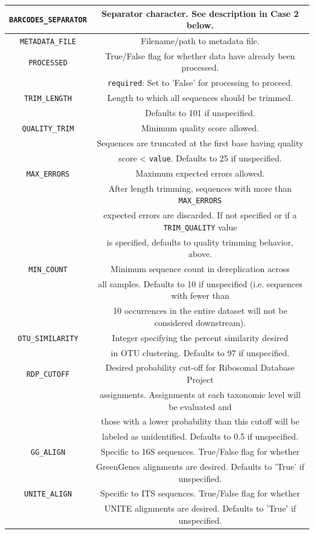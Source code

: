 \documentclass[11pt, oneside]{article}   	%
\begin{document}
\begin{table}[h!]
\begin{center}
\begin{tabular}{| c | c |}
       \hline
       {\tt BARCODES\_SEPARATOR} & Separator character.  See description in Case 2 below. \\
       \hline
       {\tt METADATA\_FILE} & Filename/path to metadata file. \\
       \hline
       {\tt PROCESSED} & True/False flag for whether data have already been processed. \\
        & {\tt required}: Set to 'False' for processing to proceed. \\
        \hline
        {\tt TRIM\_LENGTH} & Length to which all sequences should be trimmed.  \\
        & Defaults to 101 if unspecified. \\
        \hline
        {\tt QUALITY\_TRIM} & Minimum quality score allowed.  \\
        & Sequences are truncated at the first base having quality \\
        & score < {\tt value}.  Defaults to 25 if unspecified. \\
        \hline
		{\tt MAX\_ERRORS} & Maximum expected errors allowed. \\
		& After length trimming, sequences with more than {\tt MAX\_ERRORS} \\
		& expected errors are discarded. If not specified or if a {\tt TRIM\_QUALITY} value \\
		& is specified, defaults to quality trimming behavior, above. \\
		\hline
        {\tt MIN\_COUNT} & Minimum sequence count in dereplication across \\
        & all samples.  Defaults to 10 if unspecified (i.e. sequences with fewer than  \\
        & 10 occurrences in the entire dataset will not be considered downstream). \\
        \hline
        {\tt OTU\_SIMILARITY} & Integer specifying the percent similarity desired \\
         &  in OTU clustering.  Defaults to 97 if unspecified. \\
	\hline
	{\tt RDP\_CUTOFF} & Desired probability cut-off for Ribosomal Database Project \\
	& assignments.  Assignments at each taxonomic level will be evaluated and \\
	& those with a lower probability than this cutoff will be \\
	& labeled as unidentified. Defaults to 0.5 if unspecified. \\
	\hline
	{\tt GG\_ALIGN} & Specific to 16S sequences.  True/False flag for whether \\
	& GreenGenes alignments are desired.  Defaults to 'True' if unspecified. \\
	\hline
	{\tt UNITE\_ALIGN} & Specific to ITS sequences.  True/False flag for whether \\
	& UNITE alignments are desired.  Defaults to 'True' if unspecified. \\
	\hline
    \end{tabular}
  \end{center}
\end{table}
\end{document}
